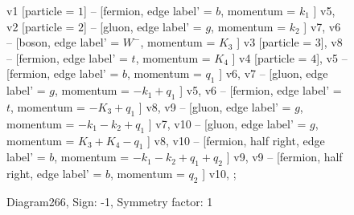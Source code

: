 \documentclass{revtex4}
\begin{document}
\begin{figure}[!htb]
\begin{center}
{    %
v1 [particle = \(1\)] -- [fermion, edge label' = \(b\), momentum = \(k_{1}\) ] v5, 
v2 [particle = \(2\)] -- [gluon, edge label' = \(g\), momentum = \(k_{2}\) ] v7, 
v6 -- [boson, edge label' = \(W^{-}\), momentum = \(K_{3}\) ] v3 [particle = \(3\)], 
v8 -- [fermion, edge label' = \(t\), momentum = \(K_{4}\) ] v4 [particle = \(4\)], 
v5 -- [fermion, edge label' = \(b\), momentum = \(q_{1}\) ] v6, 
v7 -- [gluon, edge label' = \(g\), momentum = \(-k_{1} + q_{1}\) ] v5, 
v6 -- [fermion, edge label' = \(t\), momentum = \(-K_{3} + q_{1}\) ] v8, 
v9 -- [gluon, edge label' = \(g\), momentum = \(-k_{1} - k_{2} + q_{1}\) ] v7, 
v10 -- [gluon, edge label' = \(g\), momentum = \(K_{3} + K_{4} - q_{1}\) ] v8, 
v10 -- [fermion, half right, edge label' = \(b\), momentum = \(-k_{1} - k_{2} + q_{1} + q_{2}\) ] v9, 
v9 -- [fermion, half right, edge label' = \(b\), momentum = \(q_{2}\) ] v10, 
};
\end{center}
\caption{Diagram266, Sign: -1, Symmetry factor: 1}
\end{figure}
\newpage
\end{document}
